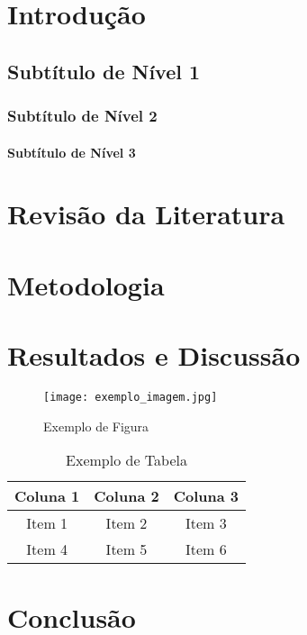 \documentclass[12pt,openright,twoside,a4paper,brazil]{abntex2}
\begin{document}
\imprimircapa
\imprimirfolhaderosto

\sumario %
\listoffigures   %
\listoftables    %

\textual

\chapter{Introdução}
\lipsum[1-2]

\section{Subtítulo de Nível 1}
\lipsum[3]
\subsection{Subtítulo de Nível 2}
\lipsum[4]
\subsubsection{Subtítulo de Nível 3}
\lipsum[5]

\chapter{Revisão da Literatura}
\lipsum[6-7]

\chapter{Metodologia}
\lipsum[8-9]

\chapter{Resultados e Discussão}
\lipsum[10]

\begin{figure}[ht]
\centering
\texttt{[image: exemplo\_imagem.jpg]}
\caption{Exemplo de Figura}
\label{fig:exemplo}
\end{figure}

\begin{table}[ht]
\centering
\begin{tabular}{|c|c|c|}
\hline
Coluna 1 & Coluna 2 & Coluna 3 \\ \hline
Item 1   & Item 2   & Item 3   \\ \hline
Item 4   & Item 5   & Item 6   \\ \hline
\end{tabular}
\caption{Exemplo de Tabela}
\label{tab:exemplo}
\end{table}

\chapter{Conclusão}
\lipsum[11-12]


\end{document}
